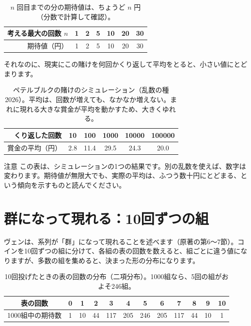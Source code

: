 \documentclass[a4paper,11pt,openany]{ltjsbook}
\begin{document}
\begin{table}[htbp]
\centering
\begin{tabular}{r|cccccc}
\toprule
考える最大の回数 $n$ & 1 & 2 & 5 & 10 & 20 & 30\\
\midrule
期待値（円） & 1 & 2 & 5 & 10 & 20 & 30\\
\bottomrule
\end{tabular}
\caption{$n$ 回目までの分の期待値は、ちょうど $n$ 円（分数で計算して確認）。}
\end{table}

それなのに、現実にこの賭けを何回かくり返して平均をとると、小さい値にとどまります。

\begin{table}[htbp]
\centering
\begin{tabular}{r|ccccc}
\toprule
くり返した回数 & 10 & 100 & 1000 & 10000 & 100000\\
\midrule
賞金の平均（円） & 2.8 & 11.4 & 29.5 & 24.3 & 20.0\\
\bottomrule
\end{tabular}
\caption{ペテルブルクの賭けのシミュレーション（乱数の種2026）。平均は、回数が増えても、なかなか増えない。まれに現れる大きな賞金が平均を動かすため、大きくゆれる。}
\end{table}

\begin{notebox}{注意}
この表は、シミュレーションの1つの結果です。別の乱数を使えば、数字は変わります。期待値が無限大でも、実際の平均は、ふつう数十円にとどまる、という傾向を示すものと読んでください。
\end{notebox}

\section{群になって現れる：10回ずつの組}

ヴェンは、系列が「群」になって現れることを述べます（原著の第6〜7節）。コインを10回ずつの組に分けて、各組の表の回数を数えると、組ごとに違う値になりますが、多数の組を集めると、決まった形の分布になります。

\begin{table}[htbp]
\centering
\small
\begin{tabular}{c|ccccccccccc}
\toprule
表の回数 & 0 & 1 & 2 & 3 & 4 & 5 & 6 & 7 & 8 & 9 & 10\\
\midrule
1000組中の期待数 & 1 & 10 & 44 & 117 & 205 & 246 & 205 & 117 & 44 & 10 & 1\\
\bottomrule
\end{tabular}
\caption{10回投げたときの表の回数の分布（二項分布）。1000組なら、5回の組がおよそ246組。}
\end{table}
\end{document}
